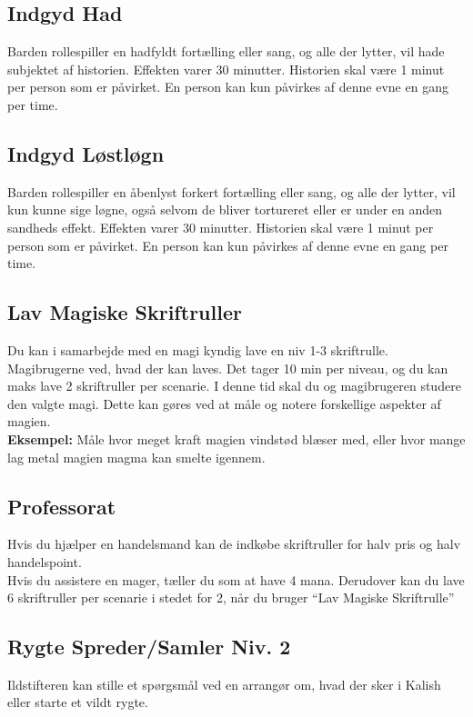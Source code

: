 \subsection*{Indgyd Had}
Barden rollespiller en hadfyldt fortælling eller sang, og alle der lytter, vil hade subjektet af historien. Effekten varer 30 minutter. Historien skal være 1 minut per person som er påvirket. En person kan kun påvirkes af denne evne en gang per time.

\subsection*{Indgyd Løstløgn}
Barden rollespiller en åbenlyst forkert fortælling eller sang, og alle der lytter, vil kun kunne sige løgne, også selvom de bliver tortureret eller er under en anden sandheds effekt. Effekten varer 30 minutter. Historien skal være 1 minut per person som er påvirket. En person kan kun påvirkes af denne evne en gang per time.

\subsection*{Lav Magiske Skriftruller}
Du kan i samarbejde med en magi kyndig lave en niv 1-3 skriftrulle. Magibrugerne ved, hvad der kan laves. Det tager 10 min per niveau, og du kan maks lave 2 skriftruller per scenarie. I denne tid skal du og magibrugeren studere den valgte magi. Dette kan gøres ved at måle og notere forskellige aspekter af magien.\\ \textbf{Eksempel:} Måle hvor meget kraft magien vindstød blæser med, eller hvor mange lag metal magien magma kan smelte igennem.

\subsection*{Professorat}
Hvis du hjælper en handelsmand kan de indkøbe skriftruller for halv pris og halv handelspoint.\\
Hvis du assistere en mager, tæller du som at have 4 mana.
Derudover kan du lave 6 skriftruller per scenarie i stedet for 2, når du bruger “Lav Magiske Skriftrulle”

\subsection*{Rygte Spreder/Samler Niv. 2}
Ildstifteren kan stille et spørgsmål ved en arrangør om, hvad der sker i Kalish eller starte et vildt rygte.

